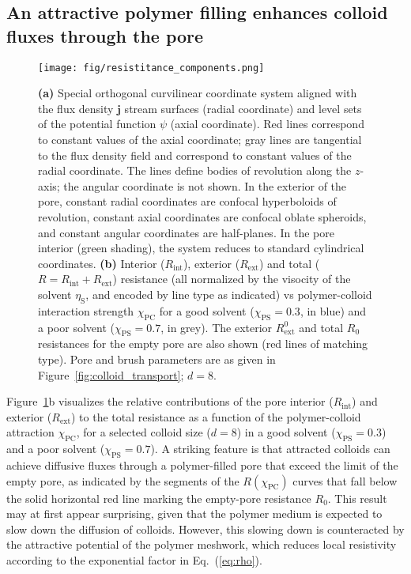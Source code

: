 \documentclass[12pt, a4paper]{article}
\begin{document}
\subsection{An attractive polymer filling enhances colloid fluxes through the pore}

\begin{figure}
    \centering
    \texttt{[image: fig/resistitance\_components.png]}
    \caption{
    \textbf{(a)} Special orthogonal curvilinear coordinate system aligned with the flux density $\bm{j}$ stream surfaces (radial coordinate) and level sets of the potential function $\psi$ (axial coordinate).
    Red lines correspond to constant values of the axial coordinate; gray lines are tangential to the flux density field and correspond to constant values of the radial coordinate.
    The lines define bodies of revolution along the $z$-axis; the angular coordinate is not shown.
    In the exterior of the pore, constant radial coordinates are confocal hyperboloids of revolution, constant axial coordinates are confocal oblate spheroids, and constant angular coordinates are half-planes.
    In the pore interior (green shading), the system reduces to standard cylindrical coordinates. 
    \textbf{(b)} Interior ($R_{\text{int}}$), exterior ($R_{\text{ext}}$) and total ($R = R_{\text{int}} + R_{\text{ext}}$) resistance (all normalized by the visocity of the solvent $\eta_\text{S}$, and encoded by line type as indicated) vs polymer-colloid interaction strength $\chi_{\text{PC}}$ for a good solvent ($\chi_{\text{PS}} = 0.3$, in blue) and a poor solvent ($\chi_{\text{PS}} = 0.7$, in grey).
    The exterior $R_{\text{ext}}^{0}$ and total $R_0$ resistances for the empty pore are also shown (red lines of matching type).  
    Pore and brush parameters are as given in Figure~\ref{fig:colloid_transport}; $d = 8$.
    }
    \label{fig:resistivity_profile}
\end{figure}

Figure~\ref{fig:resistivity_profile}b visualizes the relative contributions of the pore interior ($R_{\text{int}}$) and exterior ($R_{\text{ext}}$) to the total resistance as a function of the polymer-colloid attraction $\chi_\text{PC}$,
for a selected colloid size ($d = 8$) in a good solvent ($\chi_\text{PS} = 0.3$) and a poor solvent ($\chi_\text{PS} = 0.7$).
A striking feature is that attracted colloids can achieve diffusive fluxes through a polymer-filled pore that exceed the limit of the empty pore, as indicated by the segments of the $R(\chi_{\text{PC}})$ curves that fall below the solid horizontal red line marking the empty-pore resistance $R_{0}$.
This result may at first appear surprising, given that the polymer medium is expected to slow down the diffusion of colloids.
However, this slowing down is counteracted by the attractive potential of the polymer meshwork, which reduces local resistivity according to the exponential factor in Eq.~(\ref{eq:rho}).
\end{document}
